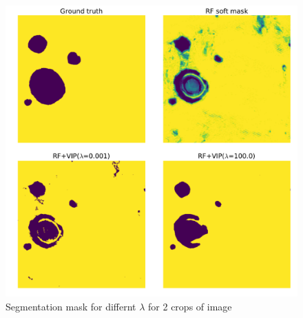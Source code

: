 \begin{figure}[h!] \label{fig:effect}
 \includegraphics[width=1.0\linewidth]{figures/lamda_effect.pdf}
\caption{Segmentation mask for differnt $\lambda$ for 2 crops of image}
\end{figure}



